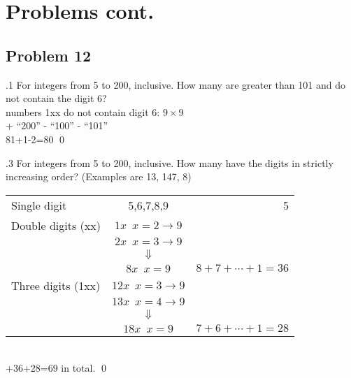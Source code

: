 \documentclass[handout]{beamer}
\begin{document}
\section{Problems cont.}

    \subsection{Problem 12}
    
        \begin{frame}[c]{\subsecname.1}
            For integers from 5 to 200, inclusive. How many are greater than 101 and do not contain the digit 6?\\$\;$\\\pause
            numbers 1xx do not contain digit 6: $9\times9$\\
            + ``200'' - ``100'' - ``101''\\
            81+1-2=80 \qed
        \end{frame}
    
        \begin{frame}[c]{\subsecname.3}
            For integers from 5 to 200, inclusive. How many have the digits in strictly increasing order? (Examples are 13, 147, 8)\\$\;$\\\pause          
                \begin{tabular}{lcr}
                     Single digit		& 5,6,7,8,9 	& 5 	\\
                     Double digits (xx)
                                & $ 1x\;\ x = 2 \rightarrow 9$ & \\
                                & $ 2x\;\ x = 3 \rightarrow 9$ &  	\\
                                & $ \Downarrow $ 	          &  	\\
                                & $ 8x\;\ x = 9 $ 	          & $ 8 + 7 + \cdots + 1 = 36 $ 	\\
                     Three digits (1xx)
                                & $ 12x\;\ x = 3 \rightarrow 9$ & \\
                                & $ 13x\;\ x = 4 \rightarrow 9$ &  	\\
                                & $ \Downarrow $ 	          &  	\\
                                & $ 18x\;\ x = 9 $ 	          & $ 7 + 6 + \cdots + 1 = 28 $ 	\\
                \end{tabular}\\$\;$\\+36+28=69 in total. \qed
        \end{frame}
    
\end{document}
